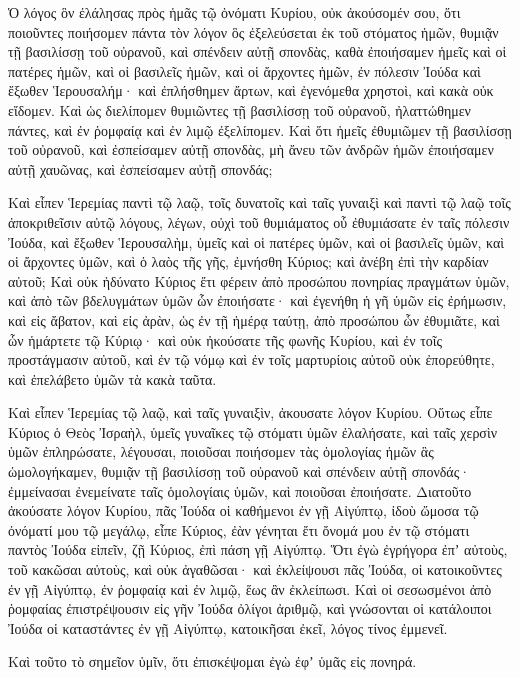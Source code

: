 {\par }{\PP {}Ὁ λόγος ὃν ἐλάλησας πρὸς ἡμᾶς τῷ ὀνόματι Κυρίου, οὐκ ἀκούσομέν σου,
ὅτι ποιοῦντες ποιήσομεν πάντα τὸν λόγον ὃς ἐξελεύσεται ἐκ τοῦ στόματος ἡμῶν, θυμιᾷν τῇ βασιλίσσῃ τοῦ οὐρανοῦ, καὶ σπένδειν αὐτῇ σπονδὰς, καθὰ ἐποιήσαμεν ἡμεῖς καὶ οἱ πατέρες ἡμῶν, καὶ οἱ βασιλεῖς ἡμῶν, καὶ οἱ ἄρχοντες ἡμῶν, ἐν πόλεσιν Ἰούδα καὶ ἔξωθεν Ἱερουσαλήμ· καὶ ἐπλήσθημεν ἄρτων, καὶ ἐγενόμεθα χρηστοὶ, καὶ κακὰ οὐκ εἴδομεν.
Καὶ ὡς διελίπομεν θυμιῶντες τῇ βασιλίσσῃ τοῦ οὐρανοῦ, ἠλαττώθημεν πάντες, καὶ ἐν ῥομφαίᾳ καὶ ἐν λιμῷ ἐξελίπομεν.
Καὶ ὅτι ἡμεῖς ἐθυμιῶμεν τῇ βασιλίσσῃ τοῦ οὐρανοῦ, καὶ ἐσπείσαμεν αὐτῇ σπονδὰς, μὴ ἄνευ τῶν ἀνδρῶν ἡμῶν ἐποιήσαμεν αὐτῇ χαυῶνας, καὶ ἐσπείσαμεν αὐτῇ σπονδάς;
\par }{\PP {}Καὶ εἶπεν Ἱερεμίας παντὶ τῷ λαῷ, τοῖς δυνατοῖς καὶ ταῖς γυναιξὶ καὶ παντὶ τῷ λαῷ τοῖς ἀποκριθεῖσιν αὐτῷ λόγους, λέγων,
οὐχὶ τοῦ θυμιάματος οὗ ἐθυμιάσατε ἐν ταῖς πόλεσιν Ἰούδα, καὶ ἔξωθεν Ἱερουσαλὴμ, ὑμεῖς καὶ οἱ πατέρες ὑμῶν, καὶ οἱ βασιλεῖς ὑμῶν, καὶ οἱ ἄρχοντες ὑμῶν, καὶ ὁ λαὸς τῆς γῆς, ἐμνήσθη Κύριος; καὶ ἀνέβη ἐπὶ τὴν καρδίαν αὐτοῦ;
Καὶ οὐκ ἠδύνατο Κύριος ἔτι φέρειν ἀπὸ προσώπου πονηρίας πραγμάτων ὑμῶν, καὶ ἀπὸ τῶν βδελυγμάτων ὑμῶν ὧν ἐποιήσατε· καὶ ἐγενήθη ἡ γῆ ὑμῶν εἰς ἐρήμωσιν, καὶ εἰς ἄβατον, καὶ εἰς ἀρὰν, ὡς ἐν τῇ ἡμέρᾳ ταύτῃ,
ἀπὸ προσώπου ὧν ἐθυμιᾶτε, καὶ ὧν ἡμάρτετε τῷ Κύριῳ· καὶ οὐκ ἠκούσατε τῆς φωνῆς Κυρίου, καὶ ἐν τοῖς προστάγμασιν αὐτοῦ, καὶ ἐν τῷ νόμῳ καὶ ἐν τοῖς μαρτυρίοις αὐτοῦ οὐκ ἐπορεύθητε, καὶ ἐπελάβετο ὑμῶν τὰ κακὰ ταῦτα.
\par }{\PP {}Καὶ εἶπεν Ἱερεμίας τῷ λαῷ, καὶ ταῖς γυναιξὶν, ἀκουσατε λόγον Κυρίου.
Οὕτως εἶπε Κύριος ὁ Θεὸς Ἰσραὴλ, ὑμεῖς γυναῖκες τῷ στόματι ὑμῶν ἐλαλήσατε, καὶ ταῖς χερσὶν ὑμῶν ἐπληρώσατε, λέγουσαι, ποιοῦσαι ποιήσομεν τὰς ὁμολογίας ἡμῶν ἃς ὡμολογήκαμεν, θυμιᾷν τῇ βασιλίσσῃ τοῦ οὐρανοῦ καὶ σπένδειν αὐτῇ σπονδάς· ἐμμείνασαι ἐνεμείνατε ταῖς ὁμολογίαις ὑμῶν, καὶ ποιοῦσαι ἐποιήσατε.
Διατοῦτο ἀκούσατε λόγον Κυρίου, πᾶς Ἰούδα οἱ καθήμενοι ἐν γῇ Αἰγύπτῳ, ἰδοὺ ὤμοσα τῷ ὀνόματί μου τῷ μεγάλῳ, εἶπε Κύριος, ἐὰν γένηται ἔτι ὄνομά μου ἐν τῷ στόματι παντὸς Ἰούδα εἰπεῖν, ζῇ Κύριος, ἐπὶ πάση γῇ Αἰγύπτῳ.
Ὅτι ἐγὼ ἐγρήγορα ἐπʼ αὐτοὺς, τοῦ κακῶσαι αὐτοὺς, καὶ οὐκ ἀγαθῶσαι· καὶ ἐκλείψουσι πᾶς Ἰούδα, οἱ κατοικοῦντες ἐν γῇ Αἰγύπτῳ, ἐν ῥομφαίᾳ καὶ ἐν λιμῷ, ἕως ἂν ἐκλείπωσι.
Καὶ οἱ σεσωσμένοι ἀπὸ ῥομφαίας ἐπιστρέψουσιν εἰς γῆν Ἰούδα ὀλίγοι ἀριθμῷ, καὶ γνώσονται οἱ κατάλοιποι Ἰούδα οἱ καταστάντες ἐν γῇ Αἰγύπτῳ, κατοικῆσαι ἐκεῖ, λόγος τίνος ἐμμενεῖ.
\par }{\PP {}Καὶ τοῦτο τὸ σημεῖον ὑμῖν, ὅτι ἐπισκέψομαι ἐγὼ ἐφʼ ὑμᾶς εἰς πονηρά.
}
